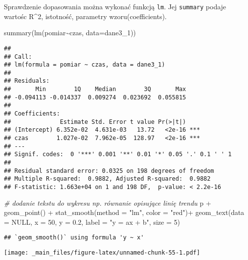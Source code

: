 \documentclass[
]{book}
\newenvironment{Shaded}{\begin{snugshade}}{\end{snugshade}}
\newcommand{\AttributeTok}[1]{\textcolor[rgb]{0.77,0.63,0.00}{#1}}
\newcommand{\CommentTok}[1]{\textcolor[rgb]{0.56,0.35,0.01}{\textit{#1}}}
\newcommand{\ConstantTok}[1]{\textcolor[rgb]{0.00,0.00,0.00}{#1}}
\newcommand{\DecValTok}[1]{\textcolor[rgb]{0.00,0.00,0.81}{#1}}
\newcommand{\FloatTok}[1]{\textcolor[rgb]{0.00,0.00,0.81}{#1}}
\newcommand{\FunctionTok}[1]{\textcolor[rgb]{0.00,0.00,0.00}{#1}}
\newcommand{\NormalTok}[1]{#1}
\newcommand{\SpecialCharTok}[1]{\textcolor[rgb]{0.00,0.00,0.00}{#1}}
\newcommand{\StringTok}[1]{\textcolor[rgb]{0.31,0.60,0.02}{#1}}
\begin{document}
Sprawdzenie dopasowania można wykonać funkcją \texttt{lm}. Jej \texttt{summary} podaje wartośc R\^{}2, istotność, parametry wzoru(coefficients).

\begin{Shaded}
\begin{Highlighting}[]
\FunctionTok{summary}\NormalTok{(}\FunctionTok{lm}\NormalTok{(pomiar}\SpecialCharTok{\textasciitilde{}}\NormalTok{czas, }\AttributeTok{data=}\NormalTok{dane3\_1))}
\end{Highlighting}
\end{Shaded}

\begin{verbatim}
## 
## Call:
## lm(formula = pomiar ~ czas, data = dane3_1)
## 
## Residuals:
##       Min        1Q    Median        3Q       Max 
## -0.094113 -0.014337  0.009274  0.023692  0.055815 
## 
## Coefficients:
##              Estimate Std. Error t value Pr(>|t|)    
## (Intercept) 6.352e-02  4.631e-03   13.72   <2e-16 ***
## czas        1.027e-02  7.962e-05  128.97   <2e-16 ***
## ---
## Signif. codes:  0 '***' 0.001 '**' 0.01 '*' 0.05 '.' 0.1 ' ' 1
## 
## Residual standard error: 0.0325 on 198 degrees of freedom
## Multiple R-squared:  0.9882, Adjusted R-squared:  0.9882 
## F-statistic: 1.663e+04 on 1 and 198 DF,  p-value: < 2.2e-16
\end{verbatim}

\begin{Shaded}
\begin{Highlighting}[]
\CommentTok{\# dodanie tekstu do wykresu np. równanie opisujące linię trendu}
\NormalTok{p }\SpecialCharTok{+} \FunctionTok{geom\_point}\NormalTok{() }\SpecialCharTok{+} \FunctionTok{stat\_smooth}\NormalTok{(}\AttributeTok{method =} \StringTok{"lm"}\NormalTok{, }\AttributeTok{color =} \StringTok{"red"}\NormalTok{)}\SpecialCharTok{+}
  \FunctionTok{geom\_text}\NormalTok{(}\AttributeTok{data =} \ConstantTok{NULL}\NormalTok{, }\AttributeTok{x =} \DecValTok{50}\NormalTok{, }\AttributeTok{y =} \FloatTok{0.2}\NormalTok{, }\AttributeTok{label =} \StringTok{"y = ax + b"}\NormalTok{, }\AttributeTok{size =} \DecValTok{5}\NormalTok{)}
\end{Highlighting}
\end{Shaded}

\begin{verbatim}
## `geom_smooth()` using formula 'y ~ x'
\end{verbatim}

\texttt{[image: \_main\_files/figure-latex/unnamed-chunk-55-1.pdf]}
\end{document}
